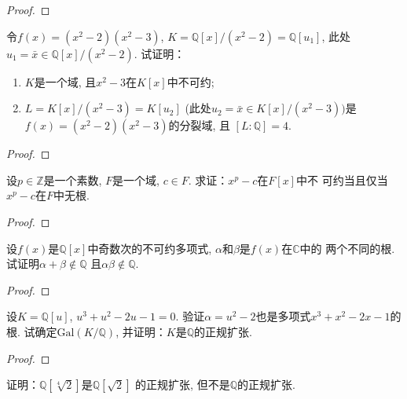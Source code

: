 \begin{proof}
    
\end{proof}

\begin{problem}
    令$f(x) = (x^2 - 2)(x^2 - 3)$,
$K = \mathbb{Q}[x]/(x^2 - 2) = \mathbb{Q}[u_1]$,
此处$u_1 = \bar{x} \in \mathbb{Q}[x]/(x^2 - 2)$.
试证明：
\begin{enumerate}[(1)]
    \item $K$是一个域, 且$x^2 - 3$在$K[x]$中不可约;
    \item $L = K[x]/(x^2 - 3) = K[u_2]$
(此处$u_2 = \bar{x} \in K[x]/(x^2 - 3))$是
$f(x) = (x^2 - 2)(x^2 - 3)$的分裂域, 且
$[L:\mathbb{Q}] = 4$.
\end{enumerate}
\end{problem}

\begin{proof}
    
\end{proof}

\begin{problem}
    设$p \in \mathbb{Z}$是一个素数, $F$是一个域,
$c\in F$. 求证：$x^p - c$在$F[x]$中不
可约当且仅当$x^p - c$在$F$中无根.
\end{problem}

\begin{proof}
    
\end{proof}

\begin{problem}
    设$f(x)$是$\mathbb{Q}[x]$中奇数次的不可约多项式,
$\alpha$和$\beta$是$f(x)$在$\mathbb{C}$中的
两个不同的根. 试证明$\alpha + \beta \notin \mathbb{Q}$
且$\alpha\beta \notin \mathbb{Q}$.
\end{problem}

\begin{proof}
    
\end{proof}

\begin{problem}
    设$K = \mathbb{Q}[u]$, $u^3 + u^2 - 2u - 1 = 0$.
验证$\alpha = u^2 - 2$也是多项式$x^3 + x^2 - 2x - 1$的根.
试确定$\mathrm{Gal}(K/\mathbb{Q})$,
并证明：$K$是$\mathbb{Q}$的正规扩张.
\end{problem}

\begin{proof}
    
\end{proof}

\begin{problem}
    证明：$\mathbb{Q}[\sqrt[4]{2}]$是$\mathbb{Q}[\sqrt{2}]$
的正规扩张, 但不是$\mathbb{Q}$的正规扩张.
\end{problem}

